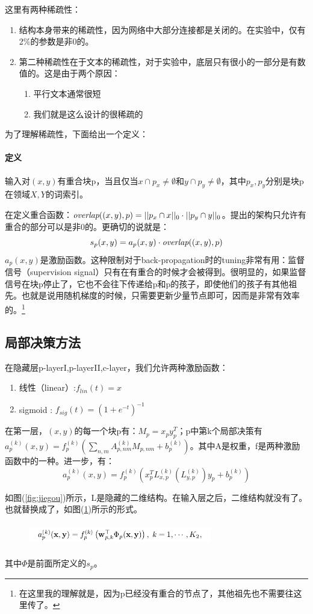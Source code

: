\documentclass[12pt,a4paper,titlepage]{article}
\begin{document}
这里有两种稀疏性：
\begin{enumerate}
\item 结构本身带来的稀疏性，因为网络中大部分连接都是关闭的。在实验中，仅有2\%的参数是非0的。
\item 第二种稀疏性在于文本的稀疏性，对于实验中，底层只有很小的一部分是有数值的。这是由于两个原因：
  \begin{enumerate}
  \item 平行文本通常很短
  \item 我们就是这么设计的很稀疏的
  \end{enumerate}
  
\end{enumerate}

为了理解稀疏性，下面给出一个定义：

\paragraph{定义}

输入对$(x,y)$有重合块p，当且仅当$x\cap p_x \neq \emptyset 和 y\cap p_y \neq \emptyset$，其中$p_x,p_y$分别是块p在领域$X,Y$的词索引。

在定义重合函数：$\emph{overlap}((x,y),p) = ||p_x \cap x||_0 \cdot || p_y \cap y ||_0 $。提出的架构只允许有重合的部分可以是非0的。更确切的说就是：
\begin{displaymath}
  s_p (x,y) = a_p (x,y) \cdot \emph{overlap} ((x,y),p)
\end{displaymath}
$a_p(x,y)$是激励函数。这种限制对于back-propagation时的tuning非常有用：监督信号（supervision signal）只有在有重合的时候才会被得到。很明显的，如果监督信号在块p停止了，它也不会往下传递给p和p的孩子，即使他们的孩子有其他祖先。也就是说用随机梯度的时候，只需要更新少量节点即可，因而是非常有效率的。\footnote{在这里我的理解就是，因为p已经没有重合的节点了，其他祖先也不需要往这里传了。}

\subsection{局部决策方法}

在隐藏层p-layerI,p-layerII,c-layer，我们允许两种激励函数：
\begin{enumerate}
\item 线性（linear）:$f_{lin}(t) = x$
\item sigmoid : $f_{sig} (t) = (1+e^{-t})^{-1}$
\end{enumerate}

在第一层，$(x,y)$的每一个块p有：$M_p = x_p y_p^{T}$；p中第k个局部决策有$a_p^{(k)}(x,y) = f_p^{(k)} (\sum_{n,m}A_{p,nm}^{(k)}M_{p,nm}+b_p^{(k)})$。其中A是权重，f是两种激励函数中的一种。进一步，有：
\begin{displaymath}
  a_p^{(k)}(x,y) = f_p^{(k)} (x_p^{T}L_{x,p}^{(k)}(L_{y,p}^{(k)})y_p+b_p^{(k)})
\end{displaymath}

如图(\ref{fig:jiegou})所示，L是隐藏的二维结构。在输入层之后，二维结构就没有了。也就替换成了，如图(\ref{fig:gongshi})所示的形式。
\begin{figure}
  \centering
  \includegraphics[height=1cm,width=8cm]{gongshi.png}
  \label{fig:gongshi}
\end{figure}
其中$\Phi$是前面所定义的$s_p$。
\end{document}
